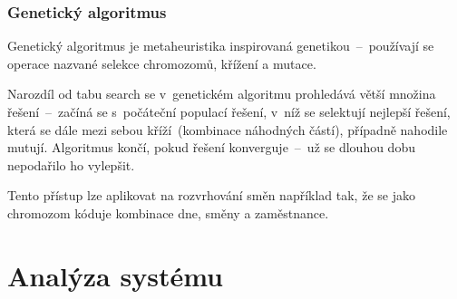 \documentclass[twoside]{ctuthesis}
\begin{document}

\subsection{Genetický algoritmus}

Genetický algoritmus je metaheuristika inspirovaná genetikou~--~používají se operace nazvané selekce chromozomů, křížení a mutace.

Narozdíl od tabu search se v~genetickém algoritmu prohledává větší množina řešení~–~začíná se s~počáteční populací řešení, v~níž se selektují nejlepší řešení, která se dále mezi sebou kříží~(kombinace náhodných částí), případně nahodile mutují. Algoritmus končí, pokud řešení konverguje~–~už se dlouhou dobu nepodařilo ho vylepšit. \cite{mallawaarachchi2017introduction}

Tento přístup lze aplikovat na rozvrhování směn například tak, že se jako chromozom kóduje kombinace dne, směny a zaměstnance. \cite{maenhout2011evolutionary}


\chapter{Analýza systému}

\end{document}
